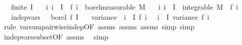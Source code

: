 \begin{isabellebody}
\ \ \ {\isachardoublequoteopen}finite\ I{\isachardoublequoteclose}\isanewline
\ \ \ {\isachardoublequoteopen}{\isasymAnd}i{\isachardot}{\kern0pt}\ i\ {\isasymin}\ I\ {\isasymLongrightarrow}\ f\ i\ {\isasymin}\ borel{\isacharunderscore}{\kern0pt}measurable\ M{\isachardoublequoteclose}\isanewline
\ \ \ {\isachardoublequoteopen}{\isasymAnd}i{\isachardot}{\kern0pt}\ i\ {\isasymin}\ I\ {\isasymLongrightarrow}\ integrable\ M\ {\isacharparenleft}{\kern0pt}{\isasymlambda}{\isasymomega}{\isachardot}{\kern0pt}\ f\ i\ {\isasymomega}{\isacharcircum}{\kern0pt}{}{\isacharparenright}{\kern0pt}{\isachardoublequoteclose}\isanewline
\ \ \ {\isachardoublequoteopen}indep{\isacharunderscore}{\kern0pt}vars\ {\isacharparenleft}{\kern0pt}{\isasymlambda}\ {\isacharunderscore}{\kern0pt}{\isachardot}{\kern0pt}\ borel{\isacharparenright}{\kern0pt}\ f\ I{\isachardoublequoteclose}\isanewline
\ \ \ {\isachardoublequoteopen}variance\ {\isacharparenleft}{\kern0pt}{\isasymlambda}{\isasymomega}{\isachardot}{\kern0pt}\ {\isacharparenleft}{\kern0pt}{\isasymSum}i\ {\isasymin}\ I{\isachardot}{\kern0pt}\ f\ i\ {\isasymomega}{\isacharparenright}{\kern0pt}{\isacharparenright}{\kern0pt}\ {\isacharequal}{\kern0pt}\ {\isacharparenleft}{\kern0pt}{\isasymSum}i\ {\isasymin}\ I{\isachardot}{\kern0pt}\ variance\ {\isacharparenleft}{\kern0pt}f\ i{\isacharparenright}{\kern0pt}{\isacharparenright}{\kern0pt}{\isachardoublequoteclose}\isanewline
%
\isadelimproof
\ \ %
\endisadelimproof
%
\isatagproof
{}\isamarkupfalse%
\ {\isacharparenleft}{\kern0pt}rule\ var{\isacharunderscore}{\kern0pt}sum{\isacharunderscore}{\kern0pt}pairwise{\isacharunderscore}{\kern0pt}indep{\isacharunderscore}{\kern0pt}{}{\isacharbrackleft}{\kern0pt}OF\ assms{\isacharparenleft}{\kern0pt}{}{\isacharparenright}{\kern0pt}\ assms{\isacharparenleft}{\kern0pt}{}{\isacharparenright}{\kern0pt}\ assms{\isacharparenleft}{\kern0pt}{}{\isacharparenright}{\kern0pt}{\isacharbrackright}{\kern0pt}{\isacharcomma}{\kern0pt}\ simp{\isacharcomma}{\kern0pt}\ simp{\isacharparenright}{\kern0pt}\isanewline
\ \ \isamarkupfalse%
\ indep{\isacharunderscore}{\kern0pt}vars{\isacharunderscore}{\kern0pt}subset{\isacharbrackleft}{\kern0pt}OF\ assms{\isacharparenleft}{\kern0pt}{}{\isacharparenright}{\kern0pt}{\isacharbrackright}{\kern0pt}\ \isamarkupfalse%
\ simp%
\endisatagproof
{\isafoldproof}%
%
\isadelimproof
\isanewline
%
\endisadelimproof
%
\isadelimtheory
\isanewline
%
\endisadelimtheory
%
\isatagtheory
{}\isamarkupfalse%
%
\endisatagtheory
{\isafoldtheory}%
%
\isadelimtheory
%
\endisadelimtheory
%
\end{isabellebody}%
